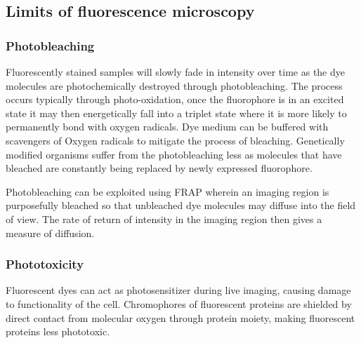 
\subsection{Limits of fluorescence microscopy}

\subsubsection{Photobleaching}

Fluorescently stained samples will slowly fade in intensity over time as the dye molecules are photochemically destroyed through photobleaching.
The process occurs typically through photo-oxidation, once the fluorophore is in an excited state it may then energetically fall into a triplet state where it is more likely to permanently bond with oxygen radicals.
Dye medium can be buffered with scavengers of Oxygen radicals to mitigate the process of bleaching.
Genetically modified organisms suffer from the photobleaching less as molecules that have bleached are constantly being replaced by newly expressed fluorophore.

Photobleaching can be exploited using FRAP wherein an imaging region is purposefully bleached so that unbleached dye molecules may diffuse into the field of view.
The rate of return of intensity in the imaging region then gives a measure of diffusion.



\subsubsection{Phototoxicity}

Fluorescent dyes can act as photosensitizer during live imaging, causing damage to functionality of the cell.
Chromophores of fluorescent proteins are shielded by direct contact from molecular oxygen through protein moiety, making fluorescent proteins less phototoxic.


